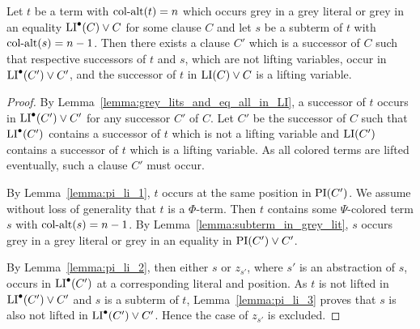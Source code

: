 \documentclass[%
	draft=false,%
	numbers=noendperiod,%
	11pt,%
	a4paper,%
	oneside,%
	openany,%
]{memoir}
\begin{document}
\cbstart
\begin{lemma}
	\label{lemma:subterm_of_multicol_term}
	Let $t$ be a term with $\operatorname{col-alt}(t)=n$ which occurs grey in a grey literal or grey in an equality $\operatorname{LI}^\bullet(C) \lor C$ for some clause $C$ and let $s$ be a subterm of $t$ with $\operatorname{col-alt}(s) = n-1$.
	Then there exists a clause $C'$ which is a successor of $C$ such that respective successors of $t$ and $s$, which are not lifting variables, occur in $\operatorname{LI}^\bullet(C') \lor C'$, and the successor of $t$ in $\operatorname{LI}(C) \lor C$ is a lifting variable.
\end{lemma}
\begin{proof}
	By Lemma~\ref{lemma:grey_lits_and_eq_all_in_LI}, a successor of $t$ occurs in $\operatorname{LI}^\bullet(C') \lor C'$ for any successor $C'$ of $C$.
	Let $C'$ be the successor of $C$ such that $\operatorname{LI}^\bullet(C')$ contains a successor of $t$ which is not a lifting variable and $\operatorname{LI}(C')$ contains a successor of $t$ which is a lifting variable.
	As all colored terms are lifted eventually, such a clause $C'$ must occur.

	By Lemma~\ref{lemma:pi_li_1}, $t$ occurs at the same position in $\operatorname{PI}(C')$.
	We assume without loss of generality that $t$ is a $\Phi$-term.
	Then $t$ contains some $\Psi$-colored term $s$ with $\operatorname{col-alt}(s) = n-1$.
	By Lemma~\ref{lemma:subterm_in_grey_lit}, $s$ occurs grey in a grey literal or grey in an equality in $\operatorname{PI}(C')\lor C'$.

	By Lemma~\ref{lemma:pi_li_2}, then either $s$ or $z_{s'}$, where $s'$ is an abstraction of $s$, occurs in $\operatorname{LI}^\bullet(C')$ at a corresponding literal and position. 
	As $t$ is not lifted in $\operatorname{LI}^\bullet(C') \lor C'$ and $s$ is a subterm of $t$, Lemma~\ref{lemma:pi_li_3} proves that $s$ is also not lifted in $\operatorname{LI}^\bullet(C') \lor C'$. Hence the case of $z_{s'}$ is excluded.
\end{proof}
\end{document}
